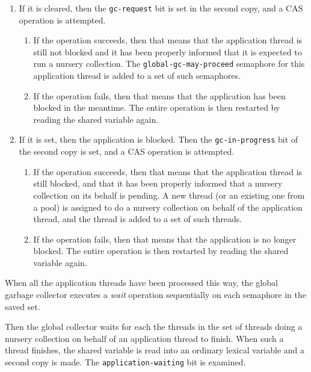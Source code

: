 \begin{enumerate}
\item If it is cleared, then the \texttt{gc-request} bit is set in the
  second copy, and a CAS operation is attempted.
  \begin{enumerate}
  \item If the operation succeeds, then that means that the
    application thread is still not blocked and it has been properly
    informed that it is expected to run a nursery collection.  The
    \texttt{global-gc-may-proceed} semaphore for this application
    thread is added to a set of such semaphores.
  \item If the operation fails, then that means that the application
    has been blocked in the meantime.  The entire operation is then
    restarted by reading the shared variable again.
  \end{enumerate}
\item If it is set, then the application is blocked.  Then the
  \texttt{gc-in-progress} bit of the second copy is set, and a CAS
  operation is attempted.
  \begin{enumerate}
  \item If the operation succeeds, then that means that the
    application thread is still blocked, and that it has been properly
    informed that a nursery collection on its behalf is pending.  A
    new thread (or an existing one from a pool) is assigned to do a
    nursery collection on behalf of the application thread, and the
    thread is added to a set of such threads.
    \item If the operation fails, then that means that the application
      is no longer blocked.  The entire operation is then restarted by
      reading the shared variable again.
  \end{enumerate}
\end{enumerate}

When all the application threads have been processed this way, the
global garbage collector executes a \emph{wait} operation sequentially
on each semaphore in the saved set.

Then the global collector waits for each the threads in the set of
threads doing a nursery collection on behalf of an application thread
to finish.  When such a thread finishes, the shared variable is read
into an ordinary lexical variable and a second copy is made.  The
\texttt{application-waiting} bit is examined.

